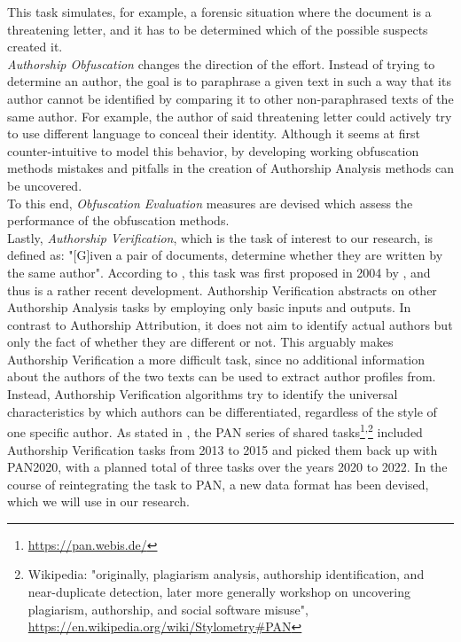 This task simulates, for example, a forensic situation where the document is a threatening letter, and it has to be determined which of the possible suspects created it.\\
\textit{Authorship Obfuscation} changes the direction of the effort.
Instead of trying to determine an author, the goal is to paraphrase a given text in such a way that its author cannot be identified by comparing it to other non-paraphrased texts of the same author.
For example, the author of said threatening letter could actively try to use different language to conceal their identity.
Although it seems at first counter-intuitive to model this behavior, by developing working obfuscation methods mistakes and pitfalls in the creation of Authorship Analysis methods can be uncovered.\\
To this end, \textit{Obfuscation Evaluation} measures are devised which assess the performance of the obfuscation methods.\\
Lastly, \textit{Authorship Verification}, which is the task of interest to our research, is defined as: "[G]iven a pair of documents, determine whether they are written by the same author".
According to \cite{stein2019unbiasedGutenbergCorpus}, this task was first proposed in 2004 by \cite{koppel2004unmasking}, and thus is a rather recent development.
Authorship Verification abstracts on other Authorship Analysis tasks by employing only basic inputs and outputs.
In contrast to Authorship Attribution, it does not aim to identify actual authors but only the fact of whether they are different or not.
This arguably makes Authorship Verification a more difficult task, since no additional information about the authors of the two texts can be used to extract author profiles from.
Instead, Authorship Verification algorithms try to identify the universal characteristics by which authors can be differentiated, regardless of the style of one specific author.
As stated in \cite{bevendorff2020shared}, the PAN series of shared tasks\footnote{\url{https://pan.webis.de/}}\textsuperscript{,}\footnote{Wikipedia: "originally, plagiarism analysis, authorship identification, and near-duplicate detection, later more generally workshop on uncovering plagiarism, authorship, and social software misuse", \url{https://en.wikipedia.org/wiki/Stylometry\#PAN}} included Authorship Verification tasks from 2013 to 2015 and picked them back up with PAN2020, with a planned total of three tasks over the years 2020 to 2022.
In the course of reintegrating the task to PAN, a new data format has been devised, which we will use in our research.\\

